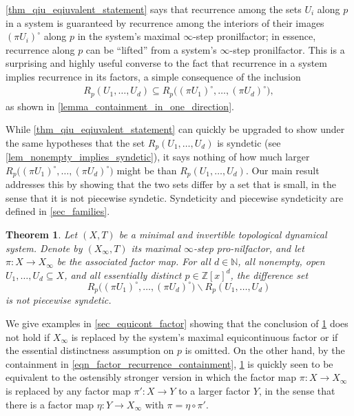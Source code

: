 \documentclass{article}
\theoremstyle{plain}
\theoremstyle{claim}
\theoremstyle{definition}
\theoremstyle{plain}
\newcounter{MainTheoremCounter}
\newtheorem{Maintheorem}[MainTheoremCounter]{Theorem}
\theoremstyle{plain}
\newcommand{\N}{\mathbb{N}}
\renewcommand{\setminus}{\backslash}
\newcommand{\1}{\boldsymbol{1}}
\begin{document}
\cref{thm_qiu_eqiuvalent_statement} says that recurrence among the sets $U_i$ along $p$ in a system is guaranteed by recurrence among the interiors of their images $(\pi U_i)^\circ$ along $p$ in the system's maximal $\infty$-step pronilfactor; in essence, recurrence along $p$ can be ``lifted'' from a system's $\infty$-step pronilfactor.  This is a surprising and highly useful converse to the fact that recurrence in a system implies recurrence in its factors, a simple consequence of the inclusion
\begin{align}
    \label{eqn_factor_recurrence_containment}
    R_p(U_1, \ldots, U_d) \subseteq R_p\big((\pi U_1)^\circ, \ldots, (\pi U_d)^\circ\big),
\end{align}
as shown in \cref{lemma_containment_in_one_direction}.

While \cref{thm_qiu_eqiuvalent_statement} can quickly be upgraded to show under the same hypotheses that the set $R_p(U_1, \ldots, U_d)$ is syndetic (see \cref{lem_nonempty_implies_syndetic}), it says nothing of how much larger $R_p\big((\pi U_1)^\circ, \ldots, (\pi U_d)^\circ\big)$ might be than $R_p(U_1, \ldots, U_d)$.  Our main result addresses this by showing that the two sets differ by a set that is small, in the sense that it is not piecewise syndetic.  Syndeticity and piecewise syndeticity are defined in \cref{sec_families}.

\begin{Maintheorem}
\label{mainthm_ps_structure_theory_pol}
Let $(X,T)$ be a minimal and invertible topological dynamical system. Denote by $(X_\infty,T)$ its maximal $\infty$-step pro-nilfactor, and let $\pi\colon X\to X_\infty$ be the associated factor map.
For all $d \in \N$, all nonempty, open $U_1, \ldots, U_d \subseteq X$, and all essentially distinct $p \in \mathbb{Z}[x]^d$, the difference set
\[
    R_p\big((\pi U_1)^\circ, \ldots, (\pi U_d)^\circ\big) \setminus R_p(U_1, \ldots, U_d)
\]
is not piecewise syndetic.
\end{Maintheorem}

We give examples in \cref{sec_equicont_factor} showing that the conclusion of \cref{mainthm_ps_structure_theory_pol} does not hold if $X_\infty$ is replaced by the system's maximal equicontinuous factor or if the essential distinctness assumption on $p$ is omitted. On the other hand, by the containment in \eqref{eqn_factor_recurrence_containment}, \cref{mainthm_ps_structure_theory_pol} is quickly seen to be equivalent to the ostensibly stronger version in which the factor map $\pi : X \to X_\infty$ is replaced by any factor map $\pi' : X \to Y$ to a larger factor $Y$, in the sense that there is a factor map $\eta : Y \to X_\infty$ with $\pi = \eta \circ \pi'$.
\end{document}
